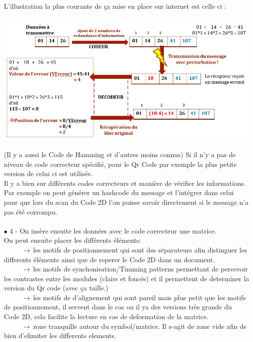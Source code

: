 \documentclass{article}
\newcommand\tab[1][1cm]{\hspace*{#1}}
\begin{document}
L'illustration la plus courante de ça mise en place sur internet est celle ci :\\
\begin{center}
\includegraphics[scale=0.4]{detectcorrect.jpg} 
\end{center}
(Il y a aussi le Code de Hamming et d'autres moins connus)
Si il n'y a pas de niveau de code correcteur spécifié, pour le Qr Code par exemple la plus petite version de celui ci est utilisée.\\
Il y a bien sur différents codes correcteurs et manière de vérifier les informations. Par exemple on peut générer un hashcode du message et l’intégrer dans celui pour que lors du scan du Code 2D l'on puisse savoir directement si le message n'a pas été corrompu.\\
\\
$\bullet$ 4 - On insère ensuite les données avec le code correcteur une matrice.\\    
On peut ensuite placer les différents éléments:\\
$\tab\rightarrow$ les motifs de positionnement qui sont des séparateurs afin distinguer les differents éléments ainsi que de reperer le Code 2D dans un document.\\
$\tab\rightarrow$ les motifs de synchonisation/Timming patterns permettant de percevoir les contrastes entre les modules (clairs et foncés) et il permettent de determiner la version du Qr code (avec ça taille.)\\
$\tab\rightarrow$ les motifs de d'alignement qui sont pareil mais plus petit que les motifs de positionnement, il servent dans le cas ou il ya des versions très grande du Code 2D, cela facilite la lecture en cas de deformation de la matrice.\\
$\tab\rightarrow$ zone tranquille autour du symbol/matrice. Il s-agit de zone vide afin de bien d'elimiter les differents elements.\\
\end{document}

